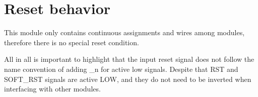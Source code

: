 \section{Reset behavior}

This module only contains continuous assignments and wires among modules, therefore there is no special reset condition. 

All in all is important to highlight that the input reset signal does not follow the name convention of adding \_n for active low signals. Despite that RST and SOFT\_RST signals are active LOW, and they do not need to be inverted when interfacing with other modules. 





